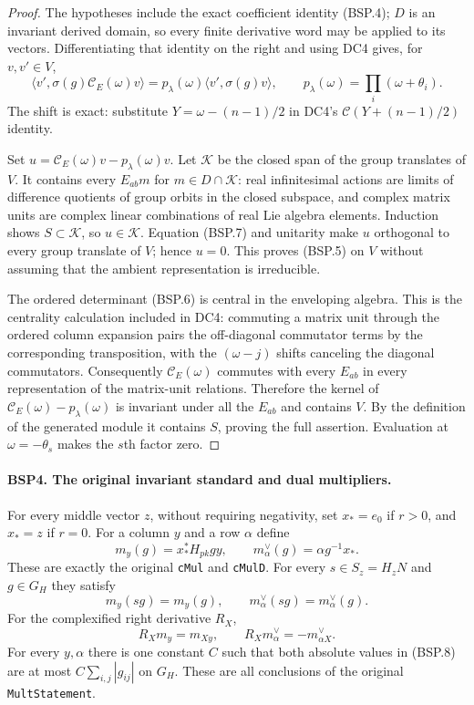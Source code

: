 \begin{proof}
The hypotheses include the exact coefficient identity (BSP.4);
$D$ is an invariant derived domain, so every finite derivative word
may be applied to its vectors.  Differentiating that identity on the
right and using DC4 gives, for $v,v'\in V$,
\[
 \langle v',\sigma(g)\mathcal C_E(\omega)v\rangle
   =p_\lambda(\omega)\langle v',\sigma(g)v\rangle,\qquad
 p_\lambda(\omega)=\prod_i(\omega+\theta_i).
 \tag{BSP.7}
\]
The shift is exact: substitute $Y=\omega-(n-1)/2$ in DC4's
$\mathcal C(Y+(n-1)/2)$ identity.

Set $u=\mathcal C_E(\omega)v-p_\lambda(\omega)v$.
Let $\mathcal K$ be the closed span of the group translates of $V$.
It contains every $E_{ab}m$ for $m\in D\cap\mathcal K$:
real infinitesimal actions are limits of difference quotients of group
orbits in the closed subspace, and complex matrix units are complex
linear combinations of real Lie algebra elements.  Induction shows
$S\subset\mathcal K$, so $u\in\mathcal K$.
Equation (BSP.7) and unitarity make $u$ orthogonal to every group
translate of $V$; hence $u=0$.  This proves (BSP.5) on $V$ without
assuming that the ambient representation is irreducible.

The ordered determinant (BSP.6) is central in the enveloping algebra.
This is the centrality calculation included in DC4: commuting a matrix
unit through the ordered column expansion pairs the off-diagonal
commutator terms by the corresponding transposition, with the
$(\omega-j)$ shifts canceling the diagonal commutators.  Consequently
$\mathcal C_E(\omega)$ commutes with every $E_{ab}$ in every
representation of the matrix-unit relations.  Therefore the kernel of
$\mathcal C_E(\omega)-p_\lambda(\omega)$ is invariant under all the
$E_{ab}$ and contains $V$.  By the definition of the generated module
it contains $S$, proving the full assertion.  Evaluation at
$\omega=-\theta_s$ makes the $s$th factor zero.
\end{proof}

\paragraph{BSP4. The original invariant standard and dual multipliers.}
\label{claim:BSP4}
For every middle vector $z$, without requiring negativity, set
$x_* = e_0$ if $r>0$, and $x_*=z$ if $r=0$.
For a column $y$ and a row $\alpha$ define
\[
 m_y(g)=x_*^*H_{pk}gy,\qquad
 m^\vee_\alpha(g)=\alpha g^{-1}x_*.
 \tag{BSP.8}
\]
These are exactly the original \texttt{cMul} and \texttt{cMulD}.
For every $s\in S_z=H_zN$ and $g\in G_H$ they satisfy
\[
 m_y(sg)=m_y(g),\qquad m^\vee_\alpha(sg)=m^\vee_\alpha(g).
 \tag{BSP.9}
\]
For the complexified right derivative $R_X$,
\[
 R_Xm_y=m_{Xy},\qquad
 R_Xm^\vee_\alpha=-m^\vee_{\alpha X}.
 \tag{BSP.10}
\]
For every $y,\alpha$ there is one constant $C$ such that both absolute
values in (BSP.8) are at most $C\sum_{i,j}|g_{ij}|$ on $G_H$.
These are all conclusions of the original \texttt{MultStatement}.

